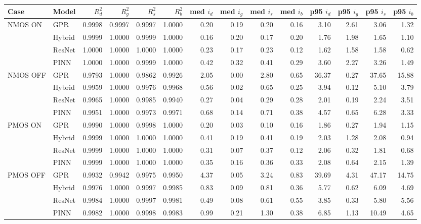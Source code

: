 \begin{tabular}{llrrrrrrrrrrrr}
\toprule
Case & Model & $R^2_{d}$ & $R^2_{g}$ & $R^2_{s}$ & $R^2_{b}$ & med $i_d$ & med $i_g$ & med $i_s$ & med $i_b$ & p95 $i_d$ & p95 $i_g$ & p95 $i_s$ & p95 $i_b$ \\
\midrule
NMOS ON & GPR & 0.9998 & 0.9997 & 0.9997 & 1.0000 & 0.20 & 0.19 & 0.20 & 0.16 & 3.10 & 2.61 & 3.06 & 1.32 \\
 & Hybrid & 0.9999 & 1.0000 & 0.9999 & 1.0000 & 0.16 & 0.20 & 0.17 & 0.20 & 1.76 & 1.98 & 1.65 & 1.10 \\
 & ResNet & 1.0000 & 1.0000 & 1.0000 & 1.0000 & 0.23 & 0.17 & 0.23 & 0.12 & 1.62 & 1.58 & 1.58 & 0.62 \\
 & PINN & 1.0000 & 1.0000 & 0.9999 & 1.0000 & 0.42 & 0.32 & 0.41 & 0.29 & 3.60 & 2.27 & 3.26 & 1.49 \\
\midrule
NMOS OFF & GPR & 0.9793 & 1.0000 & 0.9862 & 0.9926 & 2.05 & 0.00 & 2.80 & 0.65 & 36.37 & 0.27 & 37.65 & 15.88 \\
 & Hybrid & 0.9959 & 1.0000 & 0.9976 & 0.9968 & 0.56 & 0.02 & 0.65 & 0.25 & 3.94 & 0.12 & 5.10 & 3.79 \\
 & ResNet & 0.9965 & 1.0000 & 0.9985 & 0.9940 & 0.27 & 0.04 & 0.29 & 0.28 & 2.01 & 0.19 & 2.24 & 3.51 \\
 & PINN & 0.9951 & 1.0000 & 0.9973 & 0.9971 & 0.68 & 0.14 & 0.71 & 0.38 & 4.57 & 0.65 & 6.28 & 3.33 \\
\midrule
PMOS ON & GPR & 0.9990 & 1.0000 & 0.9998 & 1.0000 & 0.20 & 0.03 & 0.10 & 0.16 & 1.86 & 0.27 & 1.94 & 1.15 \\
 & Hybrid & 0.9999 & 1.0000 & 1.0000 & 1.0000 & 0.41 & 0.19 & 0.41 & 0.19 & 2.03 & 1.28 & 2.08 & 0.94 \\
 & ResNet & 0.9999 & 1.0000 & 1.0000 & 1.0000 & 0.31 & 0.07 & 0.37 & 0.12 & 2.06 & 0.32 & 1.81 & 0.68 \\
 & PINN & 0.9999 & 1.0000 & 1.0000 & 1.0000 & 0.35 & 0.16 & 0.36 & 0.33 & 2.08 & 0.64 & 2.15 & 1.39 \\
\midrule
PMOS OFF & GPR & 0.9932 & 0.9942 & 0.9975 & 0.9950 & 4.37 & 0.05 & 3.24 & 0.83 & 39.69 & 4.31 & 47.17 & 14.75 \\
 & Hybrid & 0.9976 & 1.0000 & 0.9997 & 0.9985 & 0.83 & 0.09 & 0.81 & 0.36 & 5.77 & 0.62 & 6.09 & 4.69 \\
 & ResNet & 0.9984 & 1.0000 & 0.9997 & 0.9981 & 0.49 & 0.08 & 0.61 & 0.55 & 3.85 & 0.33 & 5.80 & 5.56 \\
 & PINN & 0.9982 & 1.0000 & 0.9998 & 0.9983 & 0.99 & 0.21 & 1.30 & 0.38 & 6.85 & 1.13 & 10.49 & 4.65 \\
\bottomrule
\end{tabular}
